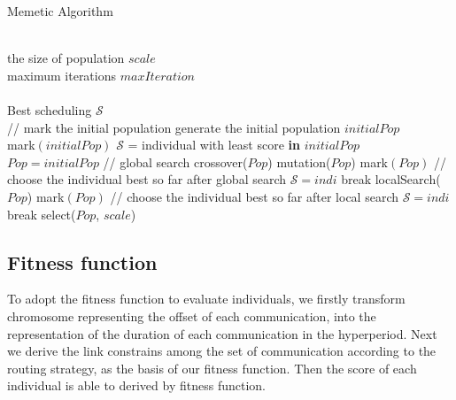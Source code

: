 \documentclass[journal]{IEEEtran}
\begin{document}
\begin{algorithm}[tb]
	\caption{Memetic Algorithm}
	\renewcommand{\algorithmicrequire}{\textbf{Input:}}
	\renewcommand{\algorithmicensure}{\textbf{Output:}}
	\begin{algorithmic}[1]
		\REQUIRE~~\\
		the size of population $scale$\\
		maximum iterations $maxIteration$\\
		\ENSURE~~\\
		Best scheduling $\mathcal{S}$\\
			\STATE // mark the initial population
				\STATE generate the	initial population $initialPop$\\
				\STATE mark$(initialPop)$
				\STATE $\mathcal{S}$ = individual with least score \textbf{in} $initialPop$
				\STATE $Pop = initialPop$
			\ELSE
			\STATE // global search
				\STATE crossover($Pop$)
				\STATE mutation($Pop$)
				\STATE mark$(Pop)$
			\ENDIF
			\STATE // choose the individual best so far after global search
					\STATE $\mathcal{S}=indi$
				\ENDIF
					\STATE break
				\ENDIF
			\ENDFOR	
			\STATE localSearch($Pop$)
			\STATE mark$(Pop)$
			\STATE // choose the individual best so far after local search
					\STATE $\mathcal{S}=indi$
				\ENDIF
					\STATE break
				\ENDIF
			\ENDFOR			
			\STATE select($Pop$, $scale$)
		\ENDFOR
	\end{algorithmic}
\end{algorithm}	

\subsection{Fitness function}

To adopt the fitness function to evaluate individuals, we firstly transform chromosome representing the offset of each communication, into the representation of the duration of each communication in the hyperperiod. Next we derive the link constrains among the set of communication according to the routing strategy, as the basis of our fitness function. Then the score of each individual is able to derived by fitness function.
\end{document}
